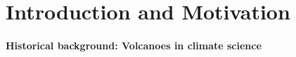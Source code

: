 \documentclass{ametsocV5}
\begin{document}

\section{Introduction and Motivation}



\paragraph*{Historical background: Volcanoes in climate science}
\end{document}
